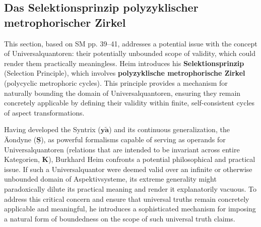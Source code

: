 \documentclass[12pt]{article}
\newcommand{\kategorie}{\bm{K}}
\newcommand{\syntrix}{\bm{y\widetilde{a}}}
\begin{document}
\subsection{Das Selektionsprinzip polyzyklischer metrophorischer Zirkel}
\label{sec:selektionsprinzip}

This section, based on SM pp. 39--41, addresses a potential issue with the concept of Universalquantoren: their potentially unbounded scope of validity, which could render them practically meaningless. Heim introduces his \textbf{Selektionsprinzip} (Selection Principle), which involves \textbf{polyzyklische metrophorische Zirkel} (polycyclic metrophoric cycles). This principle provides a mechanism for naturally bounding the domain of Universalquantoren, ensuring they remain concretely applicable by defining their validity within finite, self-consistent cycles of aspect transformations.

Having developed the Syntrix (\(\syntrix\)) and its continuous generalization, the Äondyne (\(\underline{\bm{S}}\)), as powerful formalisms capable of serving as operands for Universalquantoren (relations that are intended to be invariant across entire Kategorien, \(\kategorie\)), Burkhard Heim confronts a potential philosophical and practical issue. If such a Universalquantor were deemed valid over an infinite or otherwise unbounded domain of Aspektivsysteme, its extreme generality might paradoxically dilute its practical meaning and render it explanatorily vacuous. To address this critical concern and ensure that universal truths remain concretely applicable and meaningful, he introduces a sophisticated mechanism for imposing a natural form of boundedness on the scope of such universal truth claims.
\end{document}
